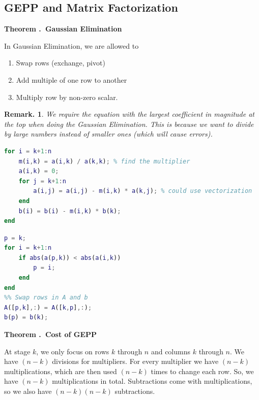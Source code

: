 \documentclass[12pt, a4paper]{article}
\newcounter{index}[subsection]
\newenvironment*{thm}[1]{\begin{tcolorbox}\par\noindent\textbf{Theorem \thesubsection.\stepcounter{index}\theindex\ #1} \par}{\par\end{tcolorbox}}
\newtheorem{rmk}{Remark.}[section]
\begin{document}
\subsection{GEPP and Matrix Factorization}
\begin{thm}{Gaussian Elimination}
	In Gaussian Elimination, we are allowed to 
	\begin{enumerate}
		\item Swap rows (exchange, pivot)
		\item Add multiple of one row to another
		\item Multiply row by non-zero scalar. 
	\end{enumerate}
\end{thm}
\begin{rmk}We require the equation with the largest coefficient in magnitude at the top when doing the Gaussian Elimination. This is because we want to divide by large numbers instead of smaller ones (which will cause errors).\end{rmk}
\begin{algorithm}\caption{General Structure of GEPP}

\BlankLine{}
\end{algorithm}
\begin{lstlisting}[language = Matlab, title = {At stage $k$, eliminate $x_k$, from rows $k+1$ to $n$}]
for i = k+1:n
	m(i,k) = a(i,k) / a(k,k); % find the multiplier
	a(i,k) = 0;
	for j = k+1:n
		a(i,j) = a(i,j) - m(i,k) * a(k,j); % could use vectorization
	end
	b(i) = b(i) - m(i,k) * b(k);
end
\end{lstlisting}
\begin{lstlisting}[language = Matlab, title = {Pivoting at stage $k$: find the coefficient with the largest magnitude}]
%% The code tells us which row has the pivot.
p = k;
for i = k+1:n
	if abs(a(p,k)) < abs(a(i,k))
		p = i;
	end
end
%% Swap rows in A and b
A([p,k],:) = A([k,p],:);
b(p) = b(k);
\end{lstlisting}
\begin{thm}{Cost of GEPP}
	At stage $k$, we only focus on rows $k$ through $n$ and columns $k$ through $n$. We have $(n-k)$ divisions for multipliers. For every multiplier we have $(n-k)$ multiplications, which are then used $(n-k)$ times to change each row. So, we have $(n-k)$ multiplications in total. Subtractions come with multiplications, so we also have $(n-k)(n-k)$ subtractions. 
\end{thm}
\end{document}
